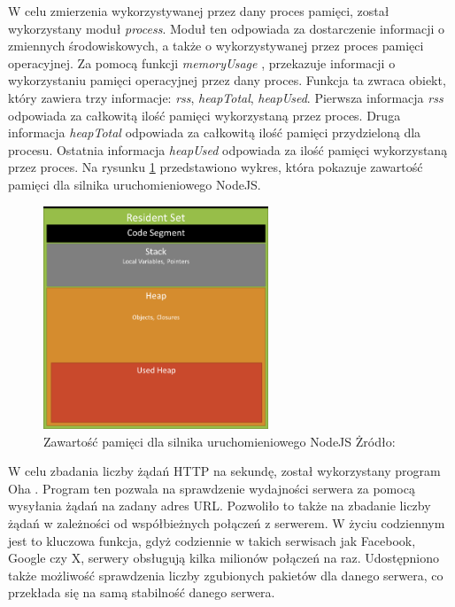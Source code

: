 W celu zmierzenia wykorzystywanej przez dany proces pamięci, został wykorzystany moduł \textit{process}. Moduł ten odpowiada za dostarczenie informacji o zmiennych środowiskowych, a także o wykorzystywanej przez proces pamięci operacyjnej. Za pomocą funkcji \textit{memoryUsage} \cite{memoryUsage} \cite{memoryUsageImage}, przekazuje informacji o wykorzystaniu pamięci operacyjnej przez dany proces. Funkcja ta zwraca obiekt, który zawiera trzy informacje: \textit{rss}, \textit{heapTotal}, \textit{heapUsed}. Pierwsza informacja \textit{rss} odpowiada za całkowitą ilość pamięci wykorzystaną przez proces. Druga informacja \textit{heapTotal} odpowiada za całkowitą ilość pamięci przydzieloną dla procesu. Ostatnia informacja \textit{heapUsed} odpowiada za ilość pamięci wykorzystaną przez proces. Na rysunku \ref{fig:memory} przedstawiono wykres, która pokazuje zawartość pamięci dla silnika uruchomieniowego NodeJS.

\begin{figure}[h]
  \centering
  \includegraphics[width=0.6\textwidth]{Figures/memoryUsage.png}
  \caption{Zawartość pamięci dla silnika uruchomieniowego NodeJS Żródło: \cite{memoryUsageImage}}
  \label{fig:memory}
\end{figure}

W celu zbadania liczby żądań HTTP na sekundę, został wykorzystany program Oha \cite{oha}. Program ten pozwala na sprawdzenie wydajności serwera za pomocą wysyłania żądań na zadany adres URL. Pozwoliło to także na zbadanie liczby żądań w zależności od współbieżnych połączeń z serwerem. W życiu codziennym jest to kluczowa funkcja, gdyż codziennie w takich serwisach jak Facebook, Google czy X, serwery obsługują kilka milionów połączeń na raz. Udostępniono także możliwość sprawdzenia liczby zgubionych pakietów dla danego serwera, co przekłada się na samą stabilność danego serwera.